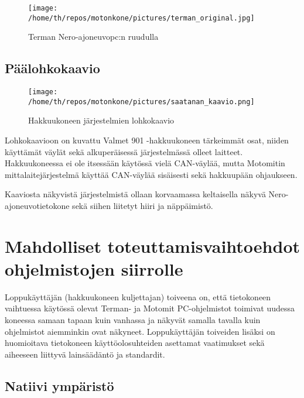 \documentclass[11pt,a4paper,oneside,article]{memoir}
\begin{document}
\begin{figure}[H]
\centering
\texttt{[image: /home/th/repos/motonkone/pictures/terman\_original.jpg]}
\caption{Terman Nero-ajoneuvopc:n ruudulla}
\end{figure}

\newpage
\section{Päälohkokaavio}

\begin{figure}[H]
\centering
\texttt{[image: /home/th/repos/motonkone/pictures/saatanan\_kaavio.png]}
\caption{Hakkuukoneen järjestelmien lohkokaavio}
\end{figure}

Lohkokaavioon on kuvattu Valmet 901 -hakkuukoneen tärkeimmät osat, niiden käyttämät väylät sekä alkuperäisessä järjestelmässä olleet laitteet. Hakkuukoneessa ei ole itsessään käytössä vielä CAN-väylää, mutta Motomitin mittalaitejärjestelmä käyttää CAN-väylää sisäisesti sekä hakkuupään ohjaukseen.

Kaaviosta näkyvistä järjestelmistä ollaan korvaamassa keltaisella näkyvä Nero-ajoneuvotietokone sekä siihen liitetyt hiiri ja näppäimistö.

\newpage
\chapter{Mahdolliset toteuttamisvaihtoehdot ohjelmistojen siirrolle}

Loppukäyttäjän (hakkuukoneen kuljettajan) toiveena on, että tietokoneen vaihtuessa käytössä olevat Terman- ja Motomit PC-ohjelmistot toimivat uudessa koneessa samaan tapaan kuin vanhassa ja näkyvät samalla tavalla kuin ohjelmistot aiemminkin ovat näkyneet. Loppukäyttäjän toiveiden lisäksi on huomioitava tietokoneen käyttöolosuhteiden asettamat vaatimukset sekä aiheeseen liittyvä lainsäädäntö ja standardit.

\section{Natiivi ympäristö}
\end{document}
